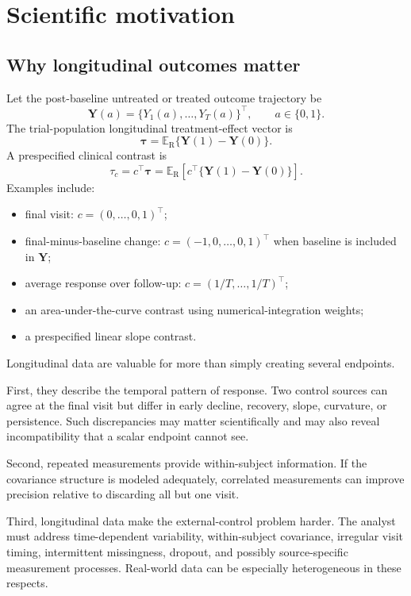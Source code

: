 \documentclass[11pt]{article}
\newcommand{\R}{\mathrm{R}}
\newcommand{\Exp}{\mathbb{E}}
\begin{document}
\section{Scientific motivation}

\subsection{Why longitudinal outcomes matter}

Let the post-baseline untreated or treated outcome trajectory be
\[
\bm Y(a)=\{Y_1(a),\ldots,Y_T(a)\}^{\top}, \qquad a\in\{0,1\}.
\]
The trial-population longitudinal treatment-effect vector is
\[
\bm\tau=\Exp_{\R}\{\bm Y(1)-\bm Y(0)\}.
\]
A prespecified clinical contrast is
\[
\tau_c=c^{\top}\bm\tau
=\Exp_{\R}\!\left[c^{\top}\{\bm Y(1)-\bm Y(0)\}\right].
\]
Examples include:
\begin{itemize}
    \item final visit: $c=(0,\ldots,0,1)^{\top}$;
    \item final-minus-baseline change: $c=(-1,0,\ldots,0,1)^{\top}$ when baseline is included in $\bm Y$;
    \item average response over follow-up: $c=(1/T,\ldots,1/T)^{\top}$;
    \item an area-under-the-curve contrast using numerical-integration weights;
    \item a prespecified linear slope contrast.
\end{itemize}

Longitudinal data are valuable for more than simply creating several endpoints.

First, they describe the temporal pattern of response. Two control sources can agree at the final visit but differ in early decline, recovery, slope, curvature, or persistence. Such discrepancies may matter scientifically and may also reveal incompatibility that a scalar endpoint cannot see.

Second, repeated measurements provide within-subject information. If the covariance structure is modeled adequately, correlated measurements can improve precision relative to discarding all but one visit.

Third, longitudinal data make the external-control problem harder. The analyst must address time-dependent variability, within-subject covariance, irregular visit timing, intermittent missingness, dropout, and possibly source-specific measurement processes. Real-world data can be especially heterogeneous in these respects.
\end{document}
